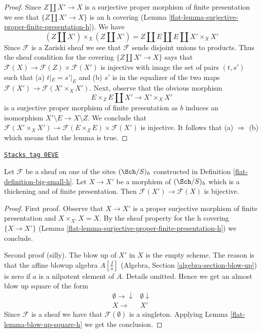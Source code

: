 \begin{proof}

Since $Z \amalg X' \to X$ is a surjective proper morphism
of finite presentation we see that $\{Z \amalg X' \to X\}$ is an h
covering (Lemma \ref{flat-lemma-surjective-proper-finite-presentation-h}).
We have
$$
(Z \amalg X') \times_X (Z \amalg X') =
Z \amalg E \amalg E \amalg X' \times_X X'
$$
Since $\mathcal{F}$ is a Zariski sheaf we see that
$\mathcal{F}$ sends disjoint unions to products.
Thus the sheaf condition for the covering
$\{Z \amalg X' \to X\}$ says that
$\mathcal{F}(X) \to \mathcal{F}(Z) \times \mathcal{F}(X')$
is injective with image the set of pairs $(t, s')$ such that
(a) $t|_E = s'|_E$ and (b) $s'$ is in the equalizer of the two maps
$\mathcal{F}(X') \to \mathcal{F}(X' \times_X X')$.
Next, observe that the obvious morphism
$$
E \times_Z E \amalg X' \longrightarrow X' \times_X X'
$$
is a surjective proper morphism of finite presentation as $b$ induces
an isomorphism $X' \setminus E \to X \setminus Z$. We conclude that
$\mathcal{F}(X' \times_X X') \to
\mathcal{F}(E \times_Z E) \times \mathcal{F}(X')$ is injective.
It follows that (a) $\Rightarrow$ (b) which means that the lemma is true.
\end{proof}

\begin{lemma}[Thickening h]
\label{flat-lemma-thickening-h}
\href{https://stacks.math.columbia.edu/tag/0EVE}{\texttt{Stacks tag 0EVE}}

Let $\mathcal{F}$ be a sheaf on one of the sites $(\Sch/S)_h$
constructed in Definition \ref{flat-definition-big-small-h}.
Let $X \to X'$ be a morphism of $(\Sch/S)_h$ which is
a thickening and of finite presentation. Then
$\mathcal{F}(X') \to \mathcal{F}(X)$ is bijective.
\end{lemma}

\begin{proof}

First proof. Observe that $X \to X'$ is a proper surjective morphism of
finite presentation and $X \times_{X'} X = X$.
By the sheaf property for the h covering $\{X \to X'\}$
(Lemma \ref{flat-lemma-surjective-proper-finite-presentation-h})
we conclude.

\medskip\noindent
Second proof (silly). The blow up of $X'$ in $X$ is the empty scheme.
The reason is that the affine blowup algebra $A[\frac{I}{a}]$
(Algebra, Section \ref{algebra-section-blow-up})
is zero if $a$ is a nilpotent element of $A$. Details omitted.
Hence we get an almost blow up square of the form
$$
\begin{array}{cc}\emptyset \longrightarrow\downarrow & \emptyset \downarrow \\ X \longrightarrow & X'\end{array}
$$
Since $\mathcal{F}$ is a sheaf we have that $\mathcal{F}(\emptyset)$
is a singleton.
Applying Lemma \ref{flat-lemma-blow-up-square-h} we get the conclusion.
\end{proof}

